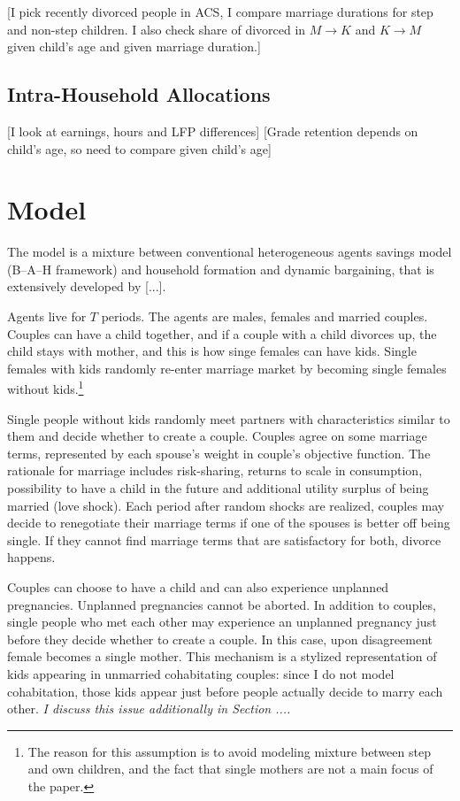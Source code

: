 \documentclass[12pt,letter]{article}
\begin{document}
[I pick recently divorced people in ACS, I compare marriage durations for step and non-step children. I also check share of divorced in $M\to K$ and $K\to M$ given child's age and given marriage duration.]


\subsection{Intra-Household Allocations}

[I look at earnings, hours and LFP differences] [Grade retention depends on child's age, so need to compare given child's age]
\section{Model}
The model is a mixture between conventional heterogeneous agents savings model (B--A--H framework) and household formation and dynamic bargaining, that is extensively developed by [...]. 

Agents live for $T$ periods. The agents are males, females and married couples. Couples can have a child together, and if a couple with a child divorces up, the child stays with mother, and this is how singe females can have kids. Single females with kids randomly re-enter marriage market by becoming single females without kids.\footnote{The reason for this assumption is to avoid modeling mixture between step and own children, and the fact that single mothers are not a main focus of the paper.}


Single people without kids randomly meet partners with characteristics similar to them and decide whether to create a couple. Couples agree on some marriage terms, represented by each spouse's weight in couple's objective function. The rationale for marriage includes risk-sharing, returns to scale in consumption, possibility to have a child in the future and additional utility surplus of being married (love shock). Each period after random shocks are realized, couples may decide to renegotiate their marriage terms if one of the spouses is better off being single. If they cannot find marriage terms that are satisfactory for both, divorce happens.

Couples can choose to have a child and can also experience unplanned pregnancies. Unplanned pregnancies cannot be aborted. In addition to couples, single people who met each other may experience an unplanned pregnancy just before they decide whether to create a couple. In this case, upon disagreement female becomes a single mother. This mechanism is a stylized representation of kids appearing in unmarried cohabitating couples: since I do not model cohabitation, those kids appear just before people actually decide to marry each other.\textit{ I discuss this issue additionally in Section ....}
\end{document}
